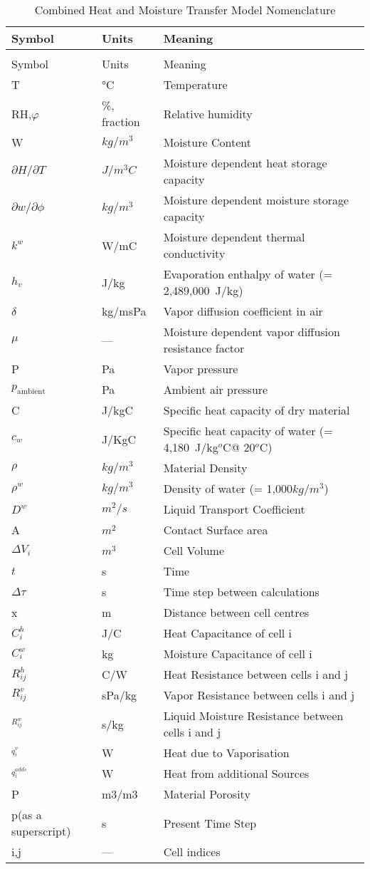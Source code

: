 \begin{longtable}[c]{p{1.5in}p{1.0in}p{3.5in}}
\caption{Combined Heat and Moisture Transfer Model Nomenclature \label{table:combined-heat-and-moisture-transfer-model}} \tabularnewline
\toprule 
Symbol & Units & Meaning \tabularnewline
\midrule
\endfirsthead

\caption[]{Combined Heat and Moisture Transfer Model Nomenclature} \tabularnewline
\toprule 
Symbol & Units & Meaning \tabularnewline
\midrule
\endhead

T & °C & Temperature \tabularnewline
RH,$\varphi$ & \%, fraction & Relative humidity \tabularnewline
W & $kg/m^3$ & Moisture Content \tabularnewline
$\partial{H}/\partial{T}$ & $J/m^3C$ & Moisture dependent heat storage capacity \tabularnewline
$\partial{w}/\partial{\phi}$ & $kg/m^3$ & Moisture dependent moisture storage capacity \tabularnewline
${k^w}$ & W/mC & Moisture dependent thermal conductivity \tabularnewline
${h_v}$ & J/kg & Evaporation enthalpy of water (= 2,489,000~J/kg) \tabularnewline
$\delta$ & kg/msPa & Vapor diffusion coefficient in air \tabularnewline
$\mu$ & --- & Moisture dependent vapor diffusion resistance factor \tabularnewline
P & Pa & Vapor pressure \tabularnewline
$p_{\text{ambient}}$ & Pa & Ambient air pressure \tabularnewline
C & J/kgC & Specific heat capacity of dry material \tabularnewline
$c_{w}$ & J/KgC & Specific heat capacity of water (= 4,180~J/kg$^{o}$C@ 20$^{o}$C) \tabularnewline
$\rho$ & $kg/m^3$ & Material Density \tabularnewline
${\rho ^w}$ & $kg/m^3$ & Density of water (= 1,000$kg/m^3$) \tabularnewline
${D^w}$ & $m^2/s$ & Liquid Transport Coefficient \tabularnewline
A & $m^2$ & Contact Surface area \tabularnewline
$\Delta {V_i}$ & $m^3$ & Cell Volume \tabularnewline
$t$ & s & Time \tabularnewline
$\Delta \tau$ & s & Time step between calculations \tabularnewline
x & m & Distance between cell centres \tabularnewline
$C_i^h$ & J/C & Heat Capacitance of cell i \tabularnewline
$C_i^w$ & kg & Moisture Capacitance of cell i \tabularnewline
$R_{ij}^h$ & C/W & Heat Resistance between cells i and j \tabularnewline
$R_{ij}^v$ & sPa/kg & Vapor Resistance between cells i and j \tabularnewline
$^{R_{ij}^w}$ & s/kg & Liquid Moisture Resistance between cells i and j \tabularnewline
$^{q_i^v}$ & W & Heat due to Vaporisation \tabularnewline
$^{q_i^{adds}}$ & W & Heat from additional Sources \tabularnewline
P & m3/m3 & Material Porosity \tabularnewline
p(as a superscript) & s & Present Time Step \tabularnewline
i,j & --- & Cell indices \tabularnewline
\bottomrule
\end{longtable}

